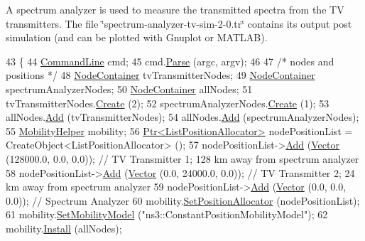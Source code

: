 A spectrum analyzer is used to measure the transmitted spectra from the TV transmitters. The file \char`\"{}spectrum-\/analyzer-\/tv-\/sim-\/2-\/0.\+tr\char`\"{} contains its output post simulation (and can be plotted with Gnuplot or M\+A\+T\+L\+AB). 
\begin{DoxyCode}
43 \{
44   \hyperlink{classns3_1_1CommandLine}{CommandLine} cmd;
45   cmd.\hyperlink{classns3_1_1CommandLine_a5c10b85b3207e5ecb48d907966923156}{Parse} (argc, argv);
46   
47   \textcolor{comment}{/* nodes and positions */}
48   \hyperlink{classns3_1_1NodeContainer}{NodeContainer} tvTransmitterNodes;
49   \hyperlink{classns3_1_1NodeContainer}{NodeContainer} spectrumAnalyzerNodes;
50   \hyperlink{classns3_1_1NodeContainer}{NodeContainer} allNodes;
51   tvTransmitterNodes.\hyperlink{classns3_1_1NodeContainer_a787f059e2813e8b951cc6914d11dfe69}{Create} (2);
52   spectrumAnalyzerNodes.\hyperlink{classns3_1_1NodeContainer_a787f059e2813e8b951cc6914d11dfe69}{Create} (1);
53   allNodes.\hyperlink{classns3_1_1NodeContainer_aa60b3a0e70f2fb324e16ffcf8bf31fcb}{Add} (tvTransmitterNodes);
54   allNodes.\hyperlink{classns3_1_1NodeContainer_aa60b3a0e70f2fb324e16ffcf8bf31fcb}{Add} (spectrumAnalyzerNodes);
55   \hyperlink{classns3_1_1MobilityHelper}{MobilityHelper} mobility;
56   \hyperlink{classns3_1_1Ptr}{Ptr<ListPositionAllocator>} nodePositionList = 
      CreateObject<ListPositionAllocator> ();
57   nodePositionList->\hyperlink{classns3_1_1ListPositionAllocator_a460e82f015ac012a73ba0ea0cccb3486}{Add} (\hyperlink{classns3_1_1Vector3D_a7e59b47bc94c9cb1dadff68c1d0112d8}{Vector} (128000.0, 0.0, 0.0)); \textcolor{comment}{// TV Transmitter 1; 128 km away from
       spectrum analyzer }
58   nodePositionList->\hyperlink{classns3_1_1ListPositionAllocator_a460e82f015ac012a73ba0ea0cccb3486}{Add} (\hyperlink{classns3_1_1Vector3D_a7e59b47bc94c9cb1dadff68c1d0112d8}{Vector} (0.0, 24000.0, 0.0)); \textcolor{comment}{// TV Transmitter 2; 24 km away from
       spectrum analyzer}
59   nodePositionList->\hyperlink{classns3_1_1ListPositionAllocator_a460e82f015ac012a73ba0ea0cccb3486}{Add} (\hyperlink{classns3_1_1Vector3D_a7e59b47bc94c9cb1dadff68c1d0112d8}{Vector} (0.0, 0.0, 0.0));  \textcolor{comment}{// Spectrum Analyzer}
60   mobility.\hyperlink{classns3_1_1MobilityHelper_ac59d5295076be3cc11021566713a28c5}{SetPositionAllocator} (nodePositionList);
61   mobility.\hyperlink{classns3_1_1MobilityHelper_a030275011b6f40682e70534d30280aba}{SetMobilityModel} (\textcolor{stringliteral}{"ns3::ConstantPositionMobilityModel"});
62   mobility.\hyperlink{classns3_1_1MobilityHelper_a07737960ee95c0777109cf2994dd97ae}{Install} (allNodes);

\end{DoxyCode}
